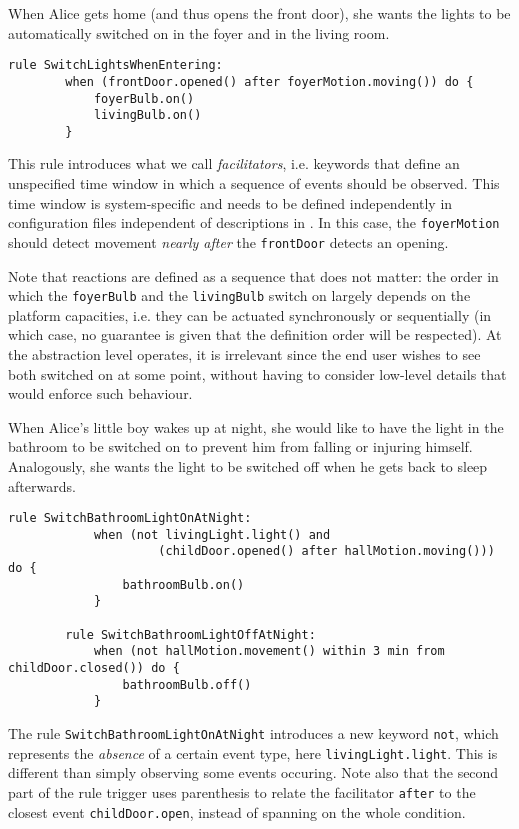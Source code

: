 \begin{description}[leftmargin=0cm]
	\item[Switching entrance lights on when coming in]  When Alice gets home (and thus opens the front door), she wants the lights to be automatically switched on in the foyer and in the living room.
	\begin{lstlisting}[language=iotdsl,
							label=lis:home-rule,
		caption=Rule to switch on the lights at home incoming]
	rule SwitchLightsWhenEntering:
		when (frontDoor.opened() after foyerMotion.moving()) do {
			foyerBulb.on() 
			livingBulb.on()
		}
	\end{lstlisting}
	This rule introduces what we call \emph{facilitators}, i.e. keywords that define an unspecified time window in which a sequence of events should be observed. This time window is system-specific and needs to be defined independently in configuration files independent of descriptions in \IOTDSL. In this case, the \lstinline[language=iotdsl]{foyerMotion} should detect movement \emph{nearly after} the \lstinline[language=iotdsl]{frontDoor} detects an opening. 
		
	Note that reactions are defined as a sequence that does not matter: the order in which the \lstinline[language=iotdsl]{foyerBulb} and the \lstinline[language=iotdsl]{livingBulb} switch on largely depends on the platform capacities, i.e. they can be actuated synchronously or sequentially (in which case, no guarantee is given that the definition order will be respected). At the abstraction level \IOTDSL operates, it is irrelevant since the end user wishes to see both switched on at some point, without having to consider low-level details that would enforce such behaviour.

	\item[Illuminate bathroom when children wake up at night] When Alice's little boy wakes up at night, she would like to have the light in the bathroom to be switched on to prevent him from falling or injuring himself. Analogously, she wants the light to be switched off when he gets back to sleep afterwards.
	\begin{lstlisting}[language=iotdsl,
							label=lis:night-rule,
		caption=Rules to switch on\//off lights in the corridor at night]
		rule SwitchBathroomLightOnAtNight:	
			when (not livingLight.light() and 
					 (childDoor.opened() after hallMotion.moving())) do {
				bathroomBulb.on()
			}
  
		rule SwitchBathroomLightOffAtNight:	
			when (not hallMotion.movement() within 3 min from childDoor.closed()) do {
				bathroomBulb.off()
			}
	\end{lstlisting}
	The rule \lstinline[language=iotdsl]{SwitchBathroomLightOnAtNight} introduces a new keyword \lstinline[language=iotdsl]{not}, which represents the \emph{absence} of a certain event type, here \lstinline[language=iotdsl]{livingLight.light}. This is different than simply observing some events occuring. Note also that the second part of the rule trigger uses parenthesis to relate the facilitator \lstinline[language=iotdsl]{after} to the closest event \lstinline[language=iotdsl]{childDoor.open}, instead of spanning on the whole condition.


\end{description}
